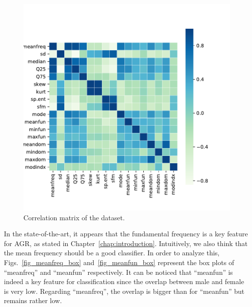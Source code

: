 \begin{figure}[htb]
	\centering
	\includegraphics[height=\BoxPlotFigHeight]{figures/correlation_matrix.pdf}
	\caption{Correlation matrix of the dataset.}
	\label{fig_corr_matrix}
\end{figure}

In the state-of-the-art, it appears that the fundamental frequency is a key feature for AGR, as stated in Chapter~\ref{chap:introduction}. Intuitively, we also think that the mean frequency should be a good classifier. In order to analyze this, Figs.~\ref{fig_meanfreq_box} and~\ref{fig_meanfun_box} represent the box plots of ``meanfreq'' and ``meanfun'' respectively. 
It can be noticed that ``meanfun'' is indeed a key feature for classification since the overlap between male and female is very low. Regarding ``meanfreq'', the overlap is bigger than for ``meanfun'' but remains rather low. 

